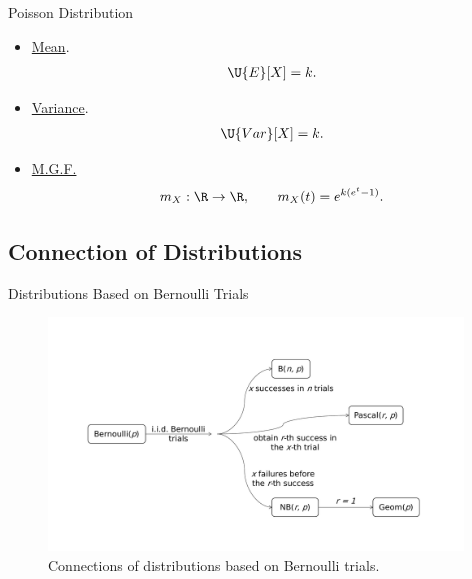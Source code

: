 \begin{frame}{Poisson Distribution}

\justifying
{} 
\begin{itemize}
\justifying
\item \underline{Mean}.
\begin{align*}
\U{E}[X] = k.
\end{align*}
\item \underline{Variance}.
\begin{align*}
\U{Var}[X] = k.
\end{align*}
\item \underline{M.G.F.}
\begin{align*}
m_X: \R \rightarrow \R, \qquad m_X(t) = e^{k(e^t-1)}.
\end{align*}
\end{itemize}

\end{frame}

\subsection{Connection of Distributions}

\begin{frame}{Distributions Based on Bernoulli Trials}

\begin{figure}[htbp]
	\centering
	\includegraphics[width=11cm]{./images/rc2fig1.pdf}
	\caption{Connections of distributions based on Bernoulli trials.}
\end{figure}

\end{frame}


